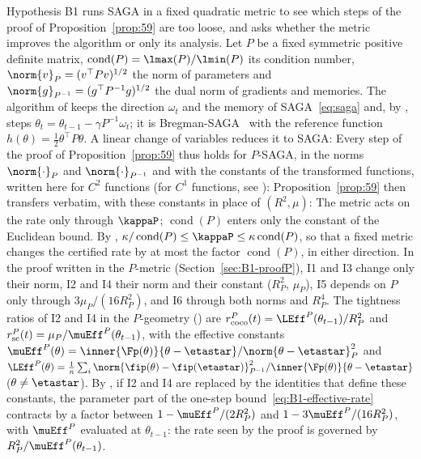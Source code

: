 Hypothesis B1 runs SAGA in a fixed quadratic metric to see which steps of the proof of Proposition~\ref{prop:59} are
too loose, and asks whether the metric improves the algorithm or only its analysis. Let $P$ be a fixed symmetric
positive definite matrix, $\operatorname{cond}(P)=\lmax(P)/\lmin(P)$ its condition number, $\norm{v}_P=(v^\top Pv)^{1/2}$
the norm of parameters and $\norm{g}_{P^{-1}}=(g^\top P^{-1}g)^{1/2}$ the dual norm of gradients and memories. The
algorithm of  keeps the direction $\omega_t$ and the memory of SAGA~\eqref{eq:saga} and, by
, steps $\theta_t=\theta_{t-1}-\gamma P^{-1}\omega_t$; it is Bregman-SAGA~\cite{dragomir2021fast}
with the reference function $h(\theta)=\frac12\theta^\top P\theta$. A linear change of variables reduces it to SAGA:
Every step of the proof of Proposition~\ref{prop:59} thus holds for $P$-SAGA, in the norms $\norm{\cdot}_P$ and
$\norm{\cdot}_{P^{-1}}$ and with the constants of the transformed functions, written here for $C^2$ functions (for
$C^1$ functions, see ):
Proposition~\ref{prop:59} then transfers verbatim, with these constants in place of $(R^2,\mu)$:
The metric acts on the rate only through $\kappaP$; $\operatorname{cond}(P)$ enters only the constant of the Euclidean
bound. By , $\kappa/\operatorname{cond}(P)\le\kappaP\le\kappa\operatorname{cond}(P)$, so that a
fixed metric changes the certified rate by at most the factor $\operatorname{cond}(P)$, in either direction. In the
proof written in the $P$-metric (Section~\ref{sec:B1-proofP}), I1 and I3 change only their norm, I2 and I4 their norm
and their constant ($R_P^2$, $\mu_P$), I5 depends on $P$ only through $3\mu_P/(16R_P^2)$, and I6 through both norms and
$R_P^4$. The tightness ratios of I2 and I4 in the $P$-geometry () are
$r^P_{\rm coco}(t)=\LEff^P(\theta_{t-1})/R_P^2$ and $r^P_{\rm sc}(t)=\mu_P/\muEff^P(\theta_{t-1})$, with the effective
constants $\muEff^P(\theta)=\inner{\Fp(\theta)}{\theta-\etastar}/\norm{\theta-\etastar}_P^2$ and
$\LEff^P(\theta)=\frac1n\sum_i\norm{\fip(\theta)-\fip(\etastar)}_{P^{-1}}^2/\inner{\Fp(\theta)}{\theta-\etastar}$
($\theta\ne\etastar$). By , if I2 and I4 are replaced by the identities that define these
constants, the parameter part of the one-step bound~\eqref{eq:B1-effective-rate} contracts by a factor between
$1-\muEff^P/(2R_P^2)$ and $1-3\muEff^P/(16R_P^2)$, with $\muEff^P$ evaluated at $\theta_{t-1}$: the rate seen by the
proof is governed by $R_P^2/\muEff^P(\theta_{t-1})$.

